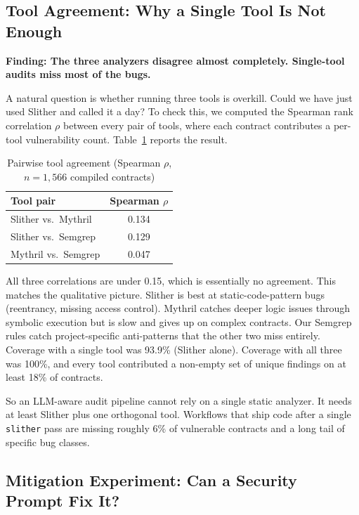 \documentclass[11pt]{article}
\begin{document}
\subsection{Tool Agreement: Why a Single Tool Is Not Enough}
\label{sec:tool_agreement}

\textbf{Finding: The three analyzers disagree almost completely. Single-tool audits miss most of the bugs.}

A natural question is whether running three tools is overkill. Could we have just used Slither and called it a day? To check this, we computed the Spearman rank correlation $\rho$ between every pair of tools, where each contract contributes a per-tool vulnerability count. Table~\ref{tab:tool_agreement} reports the result.

\begin{table}[H]
\centering
\caption{Pairwise tool agreement (Spearman $\rho$, $n=1{,}566$ compiled contracts)}
\label{tab:tool_agreement}
\begin{tabular}{@{}lc@{}}
\toprule
\textbf{Tool pair} & \textbf{Spearman $\rho$} \\
\midrule
Slither vs.\ Mythril  & 0.134 \\
Slither vs.\ Semgrep  & 0.129 \\
Mythril vs.\ Semgrep  & 0.047 \\
\bottomrule
\end{tabular}
\end{table}

All three correlations are under 0.15, which is essentially no agreement. This matches the qualitative picture. Slither is best at static-code-pattern bugs (reentrancy, missing access control). Mythril catches deeper logic issues through symbolic execution but is slow and gives up on complex contracts. Our Semgrep rules catch project-specific anti-patterns that the other two miss entirely. Coverage with a single tool was 93.9\% (Slither alone). Coverage with all three was 100\%, and every tool contributed a non-empty set of unique findings on at least 18\% of contracts.

So an LLM-aware audit pipeline cannot rely on a single static analyzer. It needs at least Slither plus one orthogonal tool. Workflows that ship code after a single \texttt{slither} pass are missing roughly 6\% of vulnerable contracts and a long tail of specific bug classes.

\subsection{Mitigation Experiment: Can a Security Prompt Fix It?}
\label{sec:mitigation}
\end{document}
